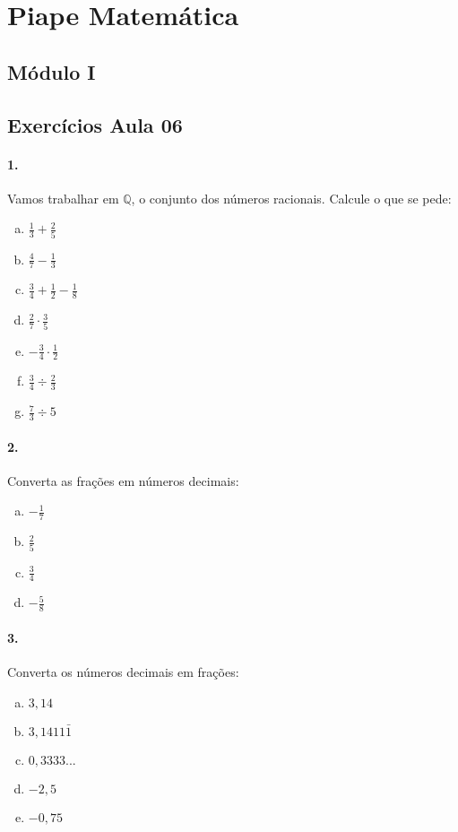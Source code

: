 \documentclass[a4paper,twocolumn,12pt]{article}
\begin{document}
 
\section*{Piape Matemática} 

\subsection*{Módulo I}
\subsection*{Exercícios Aula 06}

\paragraph*{1. } Vamos trabalhar em $\mathbb{Q}$, o conjunto dos números racionais. Calcule o que se pede:

\begin{enumerate}[a)]
\item $\frac{1}{3} + \frac{2}{5}$
\item $\frac{4}{7} - \frac{1}{3}$
\item $\frac{3}{4} + \frac{1}{2} - \frac{1}{8}$
\item $\frac{2}{7}\cdot \frac{3}{5}$
\item $-\frac{3}{4} \cdot \frac{1}{2}$
\item $\frac{3}{4} \div \frac{2}{3}$
\item $ \frac{7}{3} \div 5$
\end{enumerate}


\paragraph*{2. } Converta as frações em números decimais:
\begin{enumerate}[a)]
\item $-\frac{1}{7}$
\item $\frac{2}{5}$
\item $\frac{3}{4}$
\item $-\frac{5}{8}$
\end{enumerate}

\paragraph*{3. } Converta os números decimais em frações:
\begin{enumerate}[a)]
\item $3,\!14$
\item $3,\!1411\bar{1}$
\item $0,\!3333...$
\item $-2,\!5$
\item $-0,\!75$
\end{enumerate}
\end{document}
